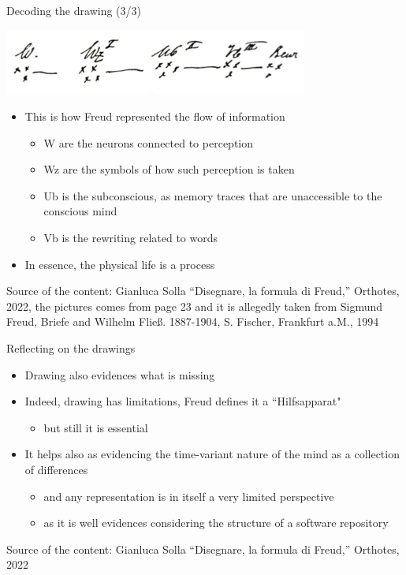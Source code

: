 \documentclass{beamer}
\begin{document}
\begin{frame}
{\centerline{Decoding the drawing (3/3)}}
 
\begin{center}
 \includegraphics[width=10cm]{P2023.AIBCCSS.Drawing/flowInsideMemory.jpg}
 
 \end{center}
\begin{itemize}
   \item This is how Freud represented the flow of information
\begin{itemize}
   \item W are the neurons connected to perception
   \item Wz are the symbols of how such perception is taken
   \item Ub is the subconscious, as memory traces that are unaccessible to the conscious mind
   \item Vb is the rewriting related to words
 \end{itemize} 
   \item In essence, the physical life is a process
 \end{itemize} 

\begin{center}
\tiny
Source of the content: Gianluca Solla ``Disegnare, la formula di Freud,'' Orthotes, 2022, the pictures comes from page 23 and it is allegedly taken from Sigmund Freud, Briefe and Wilhelm Flie\ss. 1887-1904, S. Fischer, Frankfurt a.M., 1994
\end{center}
\end{frame}

\begin{frame}
{\centerline{Reflecting on the drawings}}
\begin{itemize}
   \item Drawing also evidences what is missing
   \item Indeed, drawing has limitations, Freud defines it a ``Hilfsapparat"
   \begin{itemize}
   \item but still it is essential
   \end{itemize} 
   \item It helps also as evidencing the time-variant nature of the mind as a collection of differences 
      \begin{itemize}
   \item and any representation is in itself a very limited perspective
   \item as it is well evidences considering the structure of a software repository
   \end{itemize} 
 \end{itemize} 

\begin{center}
\tiny
Source of the content: Gianluca Solla ``Disegnare, la formula di Freud,'' Orthotes, 2022
\end{center}
\end{frame}
\end{document}

